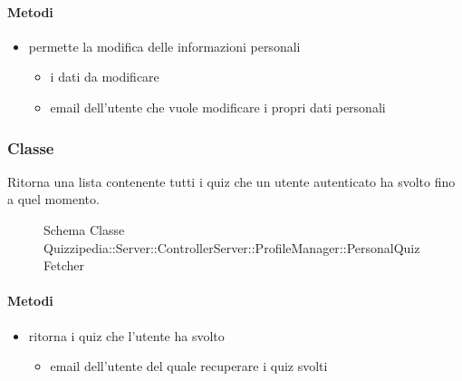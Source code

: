 \paragraph{Metodi}
\begin{itemize}
\item {}
\newline
permette la modifica delle informazioni personali
\newline
{}
\newline
\begin{itemize}
\item {}
\newline
i dati da modificare
\item {}
\newline
email dell'utente che vuole modificare i propri dati personali
\end{itemize}
\end{itemize}
\subsubsection{Classe }
Ritorna una lista contenente tutti i quiz che un utente autenticato ha svolto fino a quel momento.
\begin{figure}[H]
\centering
\noindent{}
\caption[Schema Classe PersonalQuizFetcher]{Schema Classe Quizzipedia::Server::ControllerServer::ProfileManager::PersonalQuizFetcher}
\end{figure}
\paragraph{Metodi}
\begin{itemize}
\item {}
\newline
ritorna i quiz che l'utente ha svolto
\newline
{}
\newline
\begin{itemize}
\item {}
\newline
email dell'utente del quale recuperare i quiz svolti
\end{itemize}
\end{itemize}
